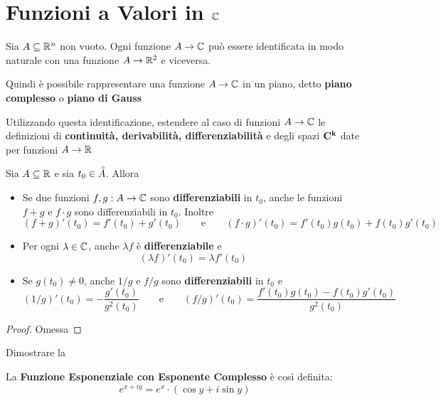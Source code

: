 \section{Funzioni a Valori in \texorpdfstring{$\protect\mathbb{C}$}{C}}\label{sect:fun_in_C}
Sia $A \subseteq \mathbb{R}^n$ non vuoto. Ogni funzione $A \to \mathbb{C}$ può essere identificata in modo naturale con una funzione $A \to \mathbb{R}^2$ e viceversa.
\begin{note}
	Quindi è possibile rappresentare una funzione $A \to \mathbb{C}$ in un piano, detto \textbf{piano complesso} o \textbf{piano di Gauss}
\end{note}
\begin{exercise}
	\label{ex:ext_def_in_C}
	Utilizzando questa identificazione, estendere al caso di funzioni $A \to \mathbb{C}$ le definizioni di \textbf{continuità, derivabilità, differenziabilità} e degli spazi $\mathbf{C^{k}}$ date per funzioni $A \to \mathbb{R}$
\end{exercise}
\begin{proposition}
	\label{prop:fg_in_C}
	Sia $A \subseteq \mathbb{R}$ e sia $t_0 \in \accentset{\circ}{A}$. Allora
	\begin{itemize}
		\item Se due funzioni $f,g: A \to \mathbb{C}$ sono \textbf{differenziabili} in $t_0$, anche le funzioni $f+g$ e $f \cdot g$ sono differenziabili in $t_0$. Inoltre
			\[(f+g)'(t_0) = f'(t_0) + g'(t_0) \qquad\text{e}\qquad (f \cdot g)'(t_0) = f'(t_0)g(t_0)+f(t_0)g'(t_0)\]
		\item Per ogni $\lambda \in \mathbb{C}$, anche $\lambda f$ è \textbf{differenziabile} e
			\[(\lambda f)'(t_0) = \lambda f'(t_0)\]
		\item Se $g(t_0) \neq 0$, anche $1/g$ e $f/g$ sono \textbf{differenziabili} in $t_0$ e
			\[(1/g)'(t_0) = - \frac{g'(t_0)}{g^2(t_0)} \qquad\text{e}\qquad (f/g)'(t_0) = \frac{f'(t_0)g(t_0)-f(t_0)g'(t_0)}{g^2(t_0)}\]
	\end{itemize}
	\begin{proof}
		Omessa
	\end{proof}
\end{proposition}
\begin{exercise}
	Dimostrare la 
\end{exercise}
\begin{definition}
	\label{def:exp_complesso}
	La \textbf{Funzione Esponenziale con Esponente Complesso} è così definita:
	\[e^{x+iy} = e^x \cdot (\cos y + i \sin y)\]
\end{definition}
